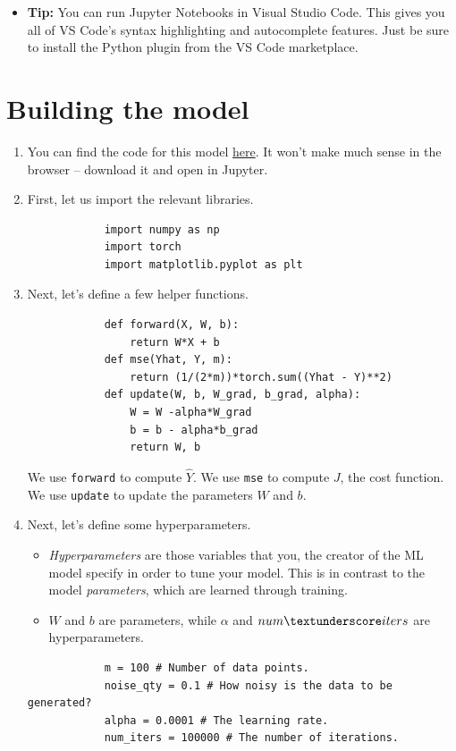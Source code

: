 \documentclass{article}
\begin{document}
    \begin{itemize}
        \item \textbf{Tip:} You can run Jupyter Notebooks in Visual Studio Code. This gives you 
        all of VS Code's syntax highlighting and autocomplete features. Just be sure to install 
        the Python plugin from the VS Code marketplace.
    \end{itemize}

    \section{Building the model}
    \begin{enumerate}
        \item You can find the code for this model \href{https://raw.githubusercontent.com/aniruddhkb/enigmatutorials/master/intro2ml/linearRegressionPytorch/linearRegressionTheDumbWay.ipynb}{here}.
        It won't make much sense in the browser -- download it and open in Jupyter.

        \item First, let us import the relevant libraries.
        \begin{verbatim}
            import numpy as np 
            import torch 
            import matplotlib.pyplot as plt 
        \end{verbatim}
        \item Next, let's define a few helper functions.
        \begin{verbatim}
            def forward(X, W, b):
                return W*X + b
            def mse(Yhat, Y, m):
                return (1/(2*m))*torch.sum((Yhat - Y)**2)
            def update(W, b, W_grad, b_grad, alpha):
                W = W -alpha*W_grad
                b = b - alpha*b_grad
                return W, b
        \end{verbatim}
        We use {\tt forward} to compute $\hat{Y}$. We use {\tt mse} 
        to compute $J$, the cost function. We use {\tt update} to update 
        the parameters $W$ and $b$.

        \item Next, let's define some hyperparameters.
        \begin{itemize}
            \item \emph{Hyperparameters} are those variables that you, the creator
            of the ML model specify in order to tune your model. This is in contrast
            to the model \emph{parameters}, which are learned through training.
            \item $W$ and $b$ are parameters, while $\alpha$ and $num\textunderscore iters$  are 
            hyperparameters.      
        \end{itemize}
        \begin{verbatim}
            m = 100 # Number of data points.
            noise_qty = 0.1 # How noisy is the data to be generated?
            alpha = 0.0001 # The learning rate.
            num_iters = 100000 # The number of iterations.
        \end{verbatim}


\end{enumerate}
\end{document}
